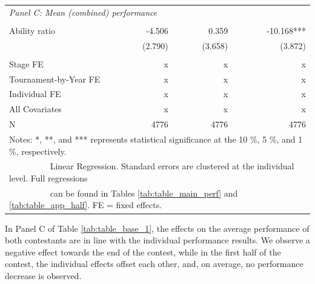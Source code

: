 \documentclass[11pt,a4paper]{article}
\begin{document}
\begin{table}[H]
\begin{tabular}{l r r r r r }
			\multicolumn{6}{l}{\textit{Panel C: Mean (combined) performance}}   \\
            \rule{0pt}{0.01ex}\\
			Ability ratio            & -4.506     & & 0.359      & & -10.168***  \\
			                         & (2.790)    & & (3.658)    & & (3.872)     \\
            \rule{0pt}{0.3ex}\\
			\midrule
			Stage FE ~~ & x  & & x & & x  \\ 
			Tournament-by-Year FE    & x  & & x & & x  \\ 
			Individual FE            & x  & & x & & x  \\ 
			All Covariates           & x  & & x & & x  \\
			\midrule 
			N                        &  4776    & &  4776   & &   4776   \\ 
			\bottomrule
			\bottomrule
			\multicolumn{6}{l}{\footnotesize Notes: *, **, and *** represents statistical significance at the 10 \%, 5 \%, and 1 \%, respectively. }\\
			\multicolumn{6}{l}{\footnotesize ~~~~~~~~~ Linear Regression. Standard errors are clustered at the individual level. Full regressions}\\
			\multicolumn{6}{l}{\footnotesize ~~~~~~~~~ can be found in Tables \ref{tab:table_main_perf} and \ref{tab:table_app_half}. FE = fixed effects.}
		\end{tabular}
	\end{table}

In Panel C of Table \ref{tab:table_base_1}, the effects on the average performance of both contestants are in line with the individual performance results. We observe a negative effect towards the end of the contest, while in the first half of the contest, the individual effects offset each other, and, on average, no performance decrease is observed. \par
\end{document}
